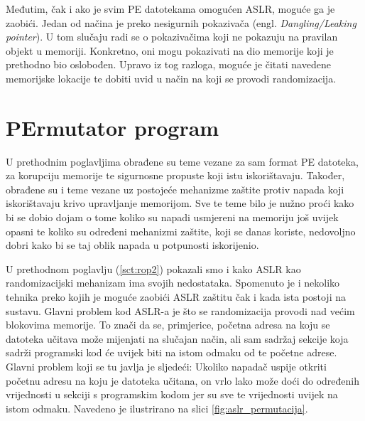 \documentclass[times, utf8, diplomski, numeric]{fer}
\begin{document}
Međutim, čak i ako je svim PE datotekama omogućen ASLR, moguće ga je zaobići. Jedan od načina je preko nesigurnih pokazivača (engl. \emph{Dangling/Leaking pointer}). U tom slučaju radi se o pokazivačima koji ne pokazuju na pravilan objekt u memoriji. Konkretno, oni mogu pokazivati na dio memorije koji je prethodno bio oslobođen. Upravo iz tog razloga, moguće je čitati navedene memorijske lokacije te dobiti uvid u način na koji se provodi randomizacija.


\chapter{PErmutator program}
\label{sct:permutator}

U prethodnim poglavljima obrađene su teme vezane za sam format PE
datoteka, za korupciju memorije te sigurnosne propuste koji istu
iskorištavaju. Također, obrađene su i teme vezane uz postojeće
mehanizme zaštite protiv napada koji iskorištavaju krivo upravljanje  memorijom. 
Sve te			%
teme bilo je nužno proći kako bi se dobio dojam o tome koliko su
napadi usmjereni na memoriju još uvijek opasni te koliko su
određeni mehanizmi zaštite, koji se danas koriste, nedovoljno
dobri kako bi se taj oblik napada u potpunosti iskorijenio.			%

U prethodnom poglavlju (\ref{sct:rop2}) pokazali smo i kako ASLR			%
kao randomizacijski mehanizam ima svojih nedostataka. Spomenuto
je i nekoliko tehnika preko kojih je moguće zaobići ASLR zaštitu
čak i kada ista postoji na sustavu. Glavni problem kod ASLR-a je
što se randomizacija provodi nad većim blokovima memorije. To
znači da se, primjerice, početna adresa na koju se datoteka
učitava može mijenjati na slučajan način, ali sam sadržaj sekcije
koja sadrži programski kod će uvijek biti na istom odmaku od te
početne adrese. Glavni problem koji se tu javlja je sljedeći:
Ukoliko napadač uspije otkriti početnu adresu na koju je datoteka
učitana, on vrlo lako može doći do određenih vrijednosti u
sekciji s programskim kodom jer su sve te vrijednosti uvijek na
istom odmaku. Navedeno je ilustrirano na slici 
\ref{fig:aslr_permutacija}.
\end{document}

